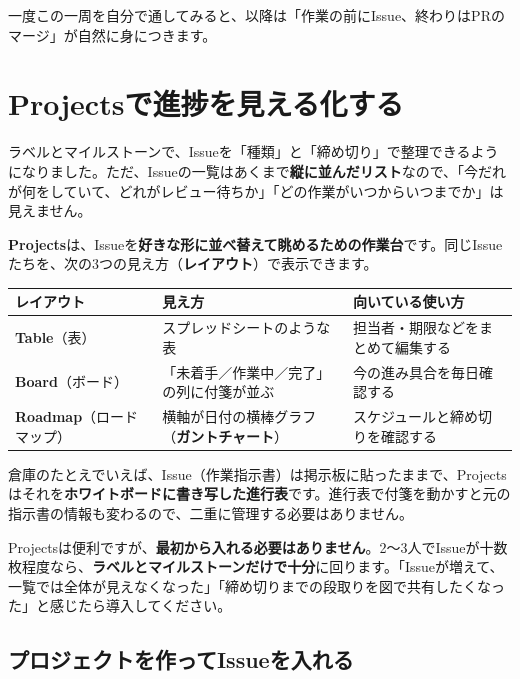 一度この一周を自分で通してみると、以降は「作業の前にIssue、終わりはPRのマージ」が自然に身につきます。

\section{Projectsで進捗を見える化する}

ラベルとマイルストーンで、Issueを「種類」と「締め切り」で整理できるようになりました。ただ、Issueの一覧はあくまで\textbf{縦に並んだリスト}なので、「今だれが何をしていて、どれがレビュー待ちか」「どの作業がいつからいつまでか」は見えません。

\textbf{Projects}は、Issueを\textbf{好きな形に並べ替えて眺めるための作業台}です。同じIssueたちを、次の3つの見え方（\textbf{レイアウト}）で表示できます。

\begin{center}
\begin{tabularx}{\linewidth}{@{}>{\raggedright\arraybackslash}p{3.2cm} >{\raggedright\arraybackslash}p{4.6cm} X@{}}
\toprule
レイアウト & 見え方 & 向いている使い方 \\
\midrule
\textbf{Table}（表） & スプレッドシートのような表 & 担当者・期限などをまとめて編集する \\
\textbf{Board}（ボード） & 「未着手／作業中／完了」の列に付箋が並ぶ & 今の進み具合を毎日確認する \\
\textbf{Roadmap}（ロードマップ） & 横軸が日付の横棒グラフ（\textbf{ガントチャート}） & スケジュールと締め切りを確認する \\
\bottomrule
\end{tabularx}
\end{center}

\medskip

倉庫のたとえでいえば、Issue（作業指示書）は掲示板に貼ったままで、Projectsはそれを\textbf{ホワイトボードに書き写した進行表}です。進行表で付箋を動かすと元の指示書の情報も変わるので、二重に管理する必要はありません。

\begin{hintbox}
Projectsは便利ですが、\textbf{最初から入れる必要はありません}。2〜3人でIssueが十数枚程度なら、\textbf{ラベルとマイルストーンだけで十分}に回ります。「Issueが増えて、一覧では全体が見えなくなった」「締め切りまでの段取りを図で共有したくなった」と感じたら導入してください。
\end{hintbox}

\subsection{プロジェクトを作ってIssueを入れる}

